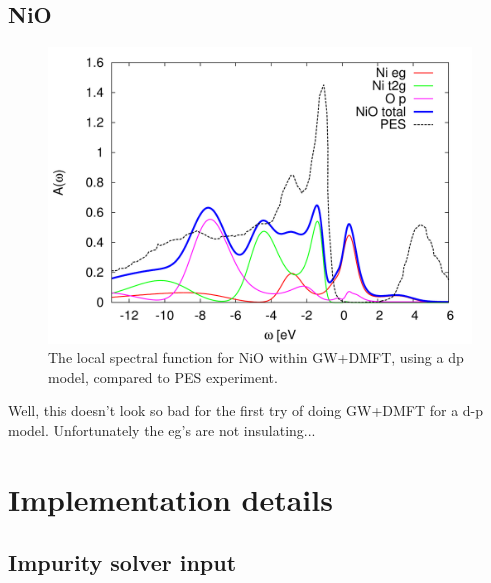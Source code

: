 \documentclass[12pt,a4paper]{scrartcl}
\numberwithin{equation}{section}
\begin{document}
\subsection{NiO}
\begin{figure}[h]
\begin{center}
\includegraphics[width=1\textwidth]{figs/results/NiO_dos.pdf} 
\end{center}
\caption{The local spectral function for NiO within GW+DMFT,
using a dp model, compared to PES experiment.}
\label{fig:results_DOS_nio}
\end{figure}

Well, this doesn't look so bad for the first try of
doing GW+DMFT for a d-p model.
Unfortunately the eg's are not insulating...


\clearpage




\section{Implementation details}

\subsection{Impurity solver input}
\end{document}
